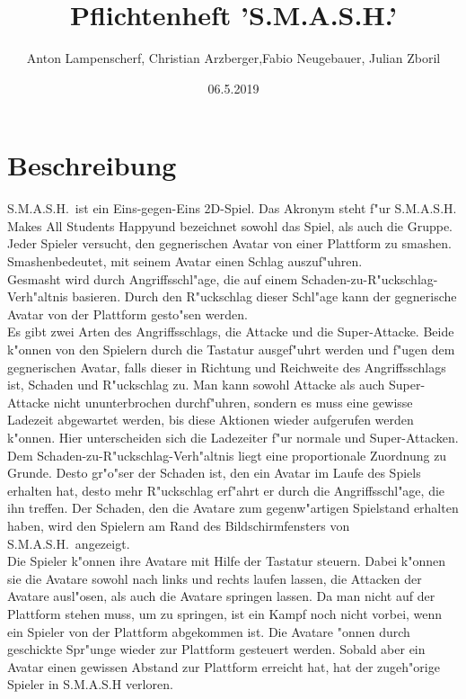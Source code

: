 \documentclass[a4paper, 11pt]{article}
\title{Pflichtenheft 'S.M.A.S.H.'}
\author{Anton Lampenscherf, Christian Arzberger,\newline  Fabio Neugebauer, Julian Zboril}
\date{06.5.2019}
\begin{document}
    \maketitle

    \section{Beschreibung}\label{sec:beschreibung}
    S.M.A.S.H.\ ist ein Eins-gegen-Eins 2D-Spiel.
    Das Akronym steht f"ur \newline\glqq S.M.A.S.H. Makes All Students Happy\grqq\space und bezeichnet sowohl das Spiel, als auch die Gruppe.
    Jeder Spieler versucht, den gegnerischen Avatar von einer Plattform zu \glqq smashen\grqq. \glqq Smashen\grqq bedeutet, mit seinem Avatar einen Schlag auszuf"uhren.\\

    \noindent
    Gesmasht wird durch Angriffsschl"age, die auf einem Schaden-zu-R"uckschlag-Verh"altnis basieren.
    Durch den R"uckschlag dieser Schl"age kann der gegnerische Avatar von der Plattform gesto"sen werden.\\

    \noindent
    Es gibt zwei Arten des Angriffsschlags, die Attacke und die Super-Attacke.
    Beide k"onnen von den Spielern durch die Tastatur ausgef"uhrt werden und f"ugen dem gegnerischen Avatar, falls dieser in Richtung und Reichweite des Angriffsschlags ist, Schaden und R"uckschlag zu.
    Man kann sowohl Attacke als auch Super-Attacke nicht ununterbrochen durchf"uhren, sondern es muss eine gewisse Ladezeit abgewartet werden, bis diese Aktionen wieder aufgerufen werden k"onnen.
    Hier unterscheiden sich die Ladezeiter f"ur normale und Super-Attacken.\\

    \noindent
    Dem Schaden-zu-R"uckschlag-Verh"altnis liegt eine proportionale Zuordnung zu Grunde.
    Desto gr"o"ser der Schaden ist, den ein Avatar im Laufe des Spiels erhalten hat, desto mehr R"uckschlag erf"ahrt er durch die Angriffsschl"age, die ihn treffen.
    Der Schaden, den die Avatare zum gegenw"artigen Spielstand erhalten haben, wird den Spielern am Rand des Bildschirmfensters von S.M.A.S.H.\ angezeigt.\\

    \noindent
    Die Spieler k"onnen ihre Avatare mit Hilfe der Tastatur steuern.
    Dabei k"onnen sie die Avatare sowohl nach links und rechts laufen lassen, die Attacken der Avatare ausl"osen, als auch die Avatare springen lassen.
    Da man nicht auf der Plattform stehen muss, um zu springen, ist ein Kampf noch nicht vorbei, wenn ein Spieler von der Plattform abgekommen ist.
    Die Avatare "onnen durch geschickte Spr"unge wieder zur Plattform gesteuert werden.
    Sobald aber ein Avatar einen gewissen Abstand zur Plattform erreicht hat, hat der zugeh"orige Spieler in S.M.A.S.H verloren.\\
\end{document}
